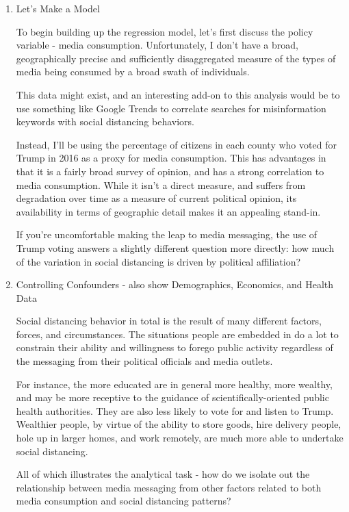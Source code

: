 \documentclass{article}
\begin{document}
\begin{enumerate}
	\item Let's Make a Model
	
	To begin building up the regression model, let's first discuss the policy variable - media consumption. Unfortunately, I don't have a broad, geographically precise and sufficiently disaggregated measure of the types of media being consumed by a broad swath of individuals.

	This data might exist, and an interesting add-on to this analysis would be to use something like Google Trends to correlate searches for misinformation keywords with social distancing behaviors. 

	Instead, I'll be using the percentage of citizens in each county who voted for Trump in 2016 as a proxy for media consumption. This has advantages in that it is a fairly broad survey of opinion, and has a strong correlation to media consumption. While it isn't a direct measure, and suffers from degradation over time as a measure of current political opinion, its availability in terms of geographic detail makes it an appealing stand-in. 

	If you're uncomfortable making the leap to media messaging, the use of Trump voting answers a slightly different question more directly: how much of the variation in social distancing is driven by political affiliation?	


	\item Controlling Confounders - also show Demographics, Economics, and Health Data

	
	Social distancing behavior in total is the result of many different factors, forces, and circumstances. The situations people are embedded in do a lot to constrain their ability and willingness to forego public activity regardless of the messaging from their political officials and media outlets.
	
	For instance, the more educated are in general more healthy, more wealthy, and may be more receptive to the guidance of scientifically-oriented public health authorities. They are also less likely to vote for and listen to Trump. Wealthier people, by virtue of the ability to store goods, hire delivery people, hole up in larger homes, and work remotely, are much more able to undertake social distancing.
	
	All of which illustrates the analytical task - how do we isolate out the relationship between media messaging from other factors related to both media consumption and social distancing patterns?
	

\end{enumerate}
\end{document}
